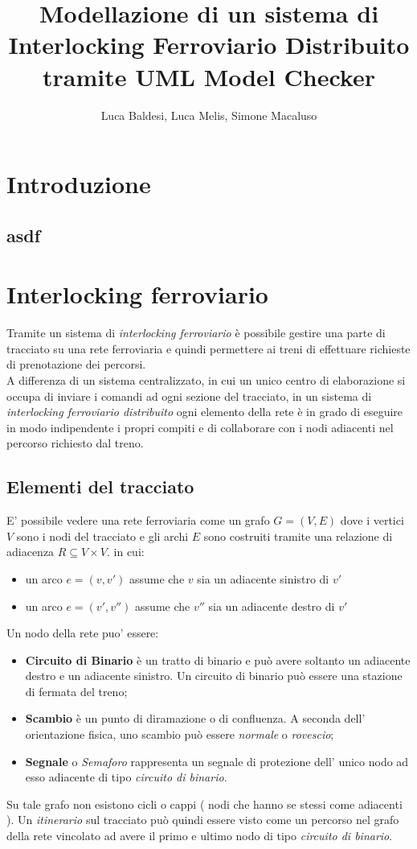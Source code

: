 \documentclass[10pt,a4paper,oneside]{report}
\author{Luca Baldesi, Luca Melis, Simone Macaluso}
\title{Modellazione di un sistema di
Interlocking Ferroviario Distribuito
tramite UML Model Checker
}
\begin{document}
\maketitle

\chapter*{Introduzione}
\section{asdf}
\chapter{Interlocking ferroviario}
Tramite un sistema di \textit{interlocking ferroviario} è possibile gestire una parte di tracciato su una rete ferroviaria e quindi permettere ai treni di effettuare richieste di prenotazione dei percorsi.\\
A differenza di un sistema centralizzato, in cui un unico centro di elaborazione si occupa di inviare i comandi ad ogni sezione del tracciato, in un sistema di \textit{interlocking ferroviario distribuito} ogni elemento della rete è in grado di eseguire in modo indipendente i propri compiti e di collaborare con i nodi adiacenti nel percorso richiesto dal treno.
\section{Elementi del tracciato} 
E' possibile vedere una rete ferroviaria come un grafo $G =(V,E) $ dove i vertici $V$ sono i nodi del tracciato e gli archi $E$ sono costruiti tramite una relazione di adiacenza $R \subseteq V \times V$. in cui:
\begin{itemize}
\item un arco $e=(v,v')$ assume che $v$ sia un adiacente sinistro di $v'$ 
\item un arco $e=(v',v'')$ assume che $v''$ sia un adiacente destro di $v'$ 
\end{itemize}
Un nodo della rete puo' essere:
\begin{itemize}
\item \textbf{Circuito di Binario} è un tratto di binario e può avere soltanto un adiacente destro e un adiacente sinistro. Un circuito di binario può essere una stazione di fermata del treno;
\item \textbf{Scambio} è un punto di diramazione o di confluenza. A seconda dell' orientazione fisica, uno scambio può essere \textit{normale} o \textit{rovescio}; 
\item \textbf{Segnale} o \emph{Semaforo} rappresenta un segnale di protezione dell' unico nodo ad esso adiacente di tipo \emph{circuito di binario}.
\end{itemize}
Su tale grafo non esistono cicli o cappi ( nodi che hanno se stessi come adiacenti ).
Un \emph{itinerario} sul tracciato può quindi essere visto come un percorso nel grafo della rete vincolato ad avere il primo e ultimo nodo di tipo \emph{circuito di binario}.
\end{document}
